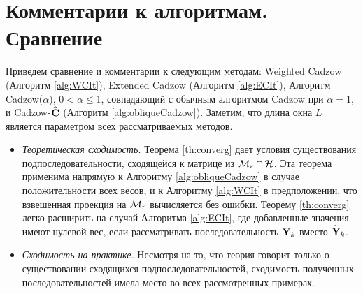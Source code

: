 \documentclass[12pt, specialist, subf,href,colorlinks=true,substylefile = spbu.rtx]{disser}
\theoremstyle{remark}
\theoremstyle{definition}
\begin{document}
\section{Комментарии к алгоритмам. Сравнение}
\label{sec:comments}
Приведем сравнение и комментарии к следующим методам: Weighted Cadzow (Алгоритм \ref{alg:WCIt}), Extended Cadzow (Алгоритм \ref{alg:ECIt}), Алгоритм Cadzow($\alpha$), $0< \alpha \leq 1$, совпадающий с обычным алгоритмом Cadzow при $\alpha=1$,
и Cadzow-$\widehat{\mathbf{C}}$ (Алгоритм \ref{alg:obliqueCadzow}).
Заметим, что длина окна $L$ является параметром всех рассматриваемых методов.

\begin{itemize}
	\item \textit{Теоретическая сходимость.}
	Теорема \ref{th:converg} дает условия существования подпоследовательности, сходящейся к матрице из $\mathcal{M}_r \cap \mathcal{H}$. Эта теорема применима напрямую к Алгоритму \ref{alg:obliqueCadzow} в случае положительности всех весов, и к Алгоритму \ref{alg:WCIt} в предположении, что взвешенная проекция на $\mathcal{M}_r$ вычисляется без ошибки. Теорему \ref{th:converg} легко расширить на случай Алгоритма \ref{alg:ECIt}, где добавленные значения имеют нулевой вес, если рассматривать последовательность $\mathbf{Y}_k$ вместо $\widetilde{\mathbf{Y}}_k$.

	\item \textit{Сходимость на практике.} Несмотря на то, что теория говорит только о существовании сходящихся подпоследовательностей, сходимость полученных последовательностей имела место во всех рассмотренных примерах.
	

\end{itemize}
\end{document}
